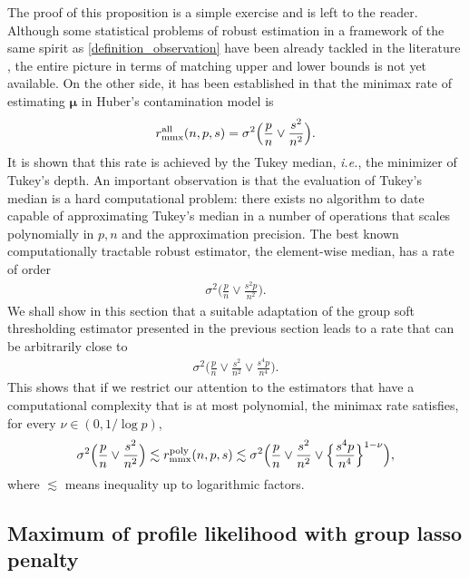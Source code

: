 \documentclass[sts,preprint,reqno,a4paper]{imsart}
\def\bmu{\boldsymbol\mu}
\theoremstyle{plain}
\theoremstyle{remark}
\theoremstyle{definition}
\begin{document}
The proof of this proposition is a simple exercise and is left to the reader.
Although some statistical problems of robust estimation in a framework of the
same spirit as \eqref{definition_observation} have been already tackled in
the literature \citep{DK12,DalalyanC12,BalDal15b,Nguyen, Klopp2017, CherapanamjeriG16}, the entire picture in terms
of matching upper and lower bounds is not yet available. On the other side,
it has been established in \citep{Gao2015} that the minimax rate of estimating
$\bmu$ in Huber's contamination model is
\begin{align}
r^{\rm all}_{\rm mmx}({n,p,s}) = \sigma^2\Big(\frac{p}{n}\vee \frac{s^2}{n^2}\Big).    
\end{align}
It is shown that this rate is achieved by the Tukey median, \textit{i.e.}, 
the minimizer of Tukey's depth. An important observation is that the evaluation of
Tukey's median is a hard computational problem: there exists no algorithm to 
date capable of approximating Tukey's median in a number of operations that scales 
polynomially in $p,n$ and the approximation precision. The best known
computationally tractable robust estimator, the element-wise median, 
has a rate of order \citep[Prop.\ 2.1]{Gao2015}
\begin{align}
\sigma^2\Big(\frac{p}{n}\vee \frac{s^2p}{n^2}\Big).    
\end{align}
We shall show in this section that a suitable adaptation of the
group soft thresholding estimator presented in the previous section
leads to a rate that can be arbitrarily close to
\begin{align}
\sigma^2\Big(\frac{p}{n}\vee\frac{s^2}{n^2}\vee \frac{s^4p}{n^4}\Big).
\end{align}
This shows that if we restrict our attention to the estimators that
have a computational complexity that is at most polynomial, the minimax
rate satisfies, for every $\nu\in(0,1/\log p)$, 
\begin{align}
\sigma^2\Big(\frac{p}{n}\vee \frac{s^2}{n^2}\Big)\lesssim 
r^{\rm poly}_{\rm mmx}({n,p,s})\lesssim 
\sigma^2\Big(\frac{p}{n}\vee\frac{s^2}{n^2}\vee \Big\{\frac{s^4p}{n^4}\Big\}^{1-\nu}\Big),
\end{align}
where $\lesssim$ means inequality up to logarithmic factors.

\subsection{Maximum of profile likelihood with group lasso penalty}
\end{document}
